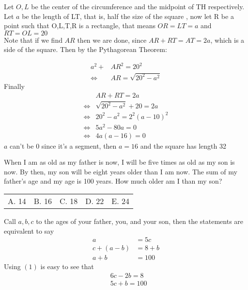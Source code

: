 \documentclass[12pt]{article}
\makeatletter
\newcounter{problem}
\newcommand{\multChoice}[5]{
    \begin{tabular}{l @{\hskip 1.5cm} l @{\hskip 1.5cm} l @{\hskip 1.5cm} l @{\hskip 1.5cm} l}
    A. #1 & B. #2 & C. #3 & D. #4 & E. #5
\end{tabular}

}
\makeatother
\begin{document}
\begin{spacing}{1.3}
\begin{solution}[E]
  Let $O,L$ be the center of the circumference and the midpoint of TH respectively.
    Let $a$ be the length of LT, that is, half the size of the square
    , now let R be a point such that O,L,T,R is a rectangle, that
    means $OR=LT=a$ and $RT=OL=20$ \\
    Note that if we find $AR$ then we are done, since $AR+RT=AT=2a$, which is a side of
    the square. Then by the Pythagorean Theorem:

    \begin{align*}
        a^2+&AR^2=20^2 \\
        \iff &AR = \sqrt{20^2-a^2} 
    \end{align*}
    Finally 
     \begin{align*}
        &AR+RT=2a \\
    \iff& \sqrt{20^2-a^2} + 20 = 2a \\
    \iff& 20^2-a^2 = 2^2(a-10)^2 \\
    \iff& 5a^2-80a=0 \\
    \iff& 4a(a-16)=0 
    \end{align*}
    $a$ can't be $0$ since it's a segment, then $a=16$ and the square has length 32
\end{solution}

\begin{problem}
      When I am as old as my father is now, I will be five times as old as my son is now. By then, my
      son will be eight years older than I am now. The sum of my father’s age and my age is 100 years.
      How much older am I than my son? \\
\end{problem}
\multChoice{14}{16}{18}{22}{24}

\begin{solution}[D]
   Call $a,b,c$ to the ages of your father, you, and your son, then the statements are
    equivalent to say 
    \begin{align}
       a &= 5c \tag{1} \label{eq:1}\\
       c + (a-b) &= 8+b \tag{2} \label{eq:2}\\
       a+b &= 100 \tag{3} \label{eq:3}
    \end{align}
    Using $(1)$ is easy to see that
    \begin{align}
       &6c-2b = 8 \tag{I} \label{eq:I}\\
       &5c+b = 100 \tag{II} \label{eq:II}
    \end{align}


\end{solution}
\end{spacing}
\end{document}
